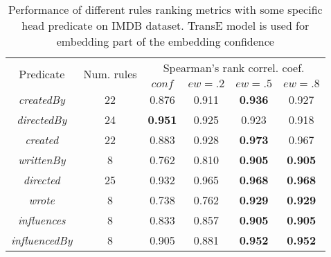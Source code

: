 \begin{table}[tbh]
\centering
\begin{tabular}{|c|c|c|c|c|c|} 
 \hline
 \multirow{2}{*}{Predicate} & \multirow{2}{*}{Num. rules} & \multicolumn{4}{|c|}{Spearman's rank correl. coef.} \\
\cline{3-6}
 & & $conf$ & $ew=.2$ & $ew=.5$ & $ew=.8$ \\
 \hline
\textit{createdBy} & 22 & 0.876 & 0.911 & \textbf{0.936} & 0.927 \\
\textit{directedBy}  & 24 & \textbf{0.951} & 0.925 & 0.923 & 0.918\\
\textit{created} &  22 & 0.883 & 0.928 & \textbf{0.973} & 0.967\\
\textit{writtenBy} & 8 & 0.762 & 0.810 & \textbf{0.905} & \textbf{0.905}\\
\textit{directed} &  25 & 0.932 & 0.965 & \textbf{0.968} & \textbf{0.968}\\
\textit{wrote} & 8 & 0.738 & 0.762 & \textbf{0.929} & \textbf{0.929}\\
\textit{influences} & 8 & 0.833 & 0.857 & \textbf{0.905} & \textbf{0.905}\\
\textit{influencedBy} & 8 & 0.905 & 0.881 & \textbf{0.952} & \textbf{0.952}\\
 \hline
\end{tabular}
\newline
\caption{Performance of different rules ranking metrics with some specific head predicate on IMDB dataset. TransE model is used for embedding part of the embedding confidence}
\label{table:imdb_predicate_spearman}
\end{table}
